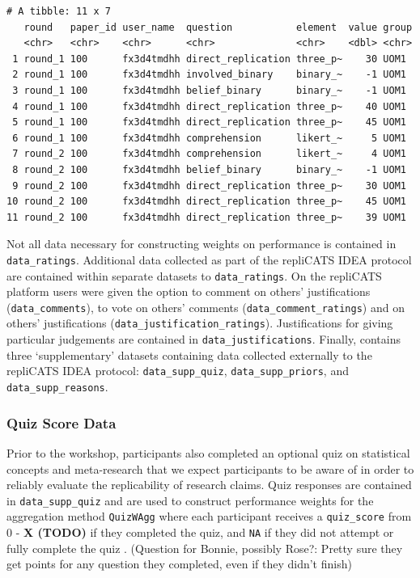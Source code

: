 \documentclass[article]{jss}
\begin{document}
\begin{verbatim}
# A tibble: 11 x 7
   round   paper_id user_name  question           element  value group
   <chr>   <chr>    <chr>      <chr>              <chr>    <dbl> <chr>
 1 round_1 100      fx3d4tmdhh direct_replication three_p~    30 UOM1 
 2 round_1 100      fx3d4tmdhh involved_binary    binary_~    -1 UOM1 
 3 round_1 100      fx3d4tmdhh belief_binary      binary_~    -1 UOM1 
 4 round_1 100      fx3d4tmdhh direct_replication three_p~    40 UOM1 
 5 round_1 100      fx3d4tmdhh direct_replication three_p~    45 UOM1 
 6 round_1 100      fx3d4tmdhh comprehension      likert_~     5 UOM1 
 7 round_2 100      fx3d4tmdhh comprehension      likert_~     4 UOM1 
 8 round_2 100      fx3d4tmdhh belief_binary      binary_~    -1 UOM1 
 9 round_2 100      fx3d4tmdhh direct_replication three_p~    30 UOM1 
10 round_2 100      fx3d4tmdhh direct_replication three_p~    45 UOM1 
11 round_2 100      fx3d4tmdhh direct_replication three_p~    39 UOM1 
\end{verbatim}

Not all data necessary for constructing weights on performance is
contained in \texttt{data\_ratings}. Additional data collected as part
of the repliCATS IDEA protocol are contained within separate datasets to
\texttt{data\_ratings}. On the repliCATS platform users were given the
option to comment on others' justifications (\texttt{data\_comments}),
to vote on others' comments (\texttt{data\_comment\_ratings}) and on
others' justifications (\texttt{data\_justification\_ratings}).
Justifications for giving particular judgements are contained in
\texttt{data\_justifications}. Finally,  contains three
`supplementary' datasets containing data collected externally to the
repliCATS IDEA protocol: \texttt{data\_supp\_quiz},
\texttt{data\_supp\_priors}, and \texttt{data\_supp\_reasons}.

\hypertarget{sec-quiz-supplementary-data}{%
\subsubsection{Quiz Score Data}\label{sec-quiz-supplementary-data}}

Prior to the workshop, participants also completed an optional quiz on
statistical concepts and meta-research that we expect participants to be
aware of in order to reliably evaluate the replicability of research
claims. Quiz responses are contained in \texttt{data\_supp\_quiz} and
are used to construct performance weights for the aggregation method
\texttt{QuizWAgg} where each participant receives a \texttt{quiz\_score}
from 0 - \textbf{X (TODO)} if they completed the quiz, and \texttt{NA}
if they did not attempt or fully complete the quiz \citep[see][ for
further details]{Hanea2021}. (Question for Bonnie, possibly Rose?:
Pretty sure they get points for any question they completed, even if
they didn't finish)
\end{document}
